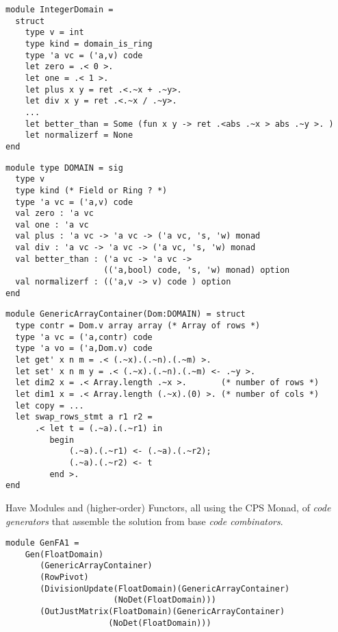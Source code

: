 \documentclass[landscape]{slides}
\begin{document}
\begin{slide}
\begin{verbatim}
module IntegerDomain = 
  struct
    type v = int
    type kind = domain_is_ring
    type 'a vc = ('a,v) code
    let zero = .< 0 >.  
    let one = .< 1 >. 
    let plus x y = ret .<.~x + .~y>. 
    let div x y = ret .<.~x / .~y>.
    ...
    let better_than = Some (fun x y -> ret .<abs .~x > abs .~y >. )
    let normalizerf = None 
end
\end{verbatim}
\end{slide}

\begin{slide}
\begin{verbatim}
module type DOMAIN = sig
  type v
  type kind (* Field or Ring ? *)
  type 'a vc = ('a,v) code
  val zero : 'a vc
  val one : 'a vc
  val plus : 'a vc -> 'a vc -> ('a vc, 's, 'w) monad
  val div : 'a vc -> 'a vc -> ('a vc, 's, 'w) monad
  val better_than : ('a vc -> 'a vc -> 
                    (('a,bool) code, 's, 'w) monad) option
  val normalizerf : (('a,v -> v) code ) option
end 
\end{verbatim}
\end{slide}

\begin{slide}
\begin{verbatim}
module GenericArrayContainer(Dom:DOMAIN) = struct
  type contr = Dom.v array array (* Array of rows *)
  type 'a vc = ('a,contr) code
  type 'a vo = ('a,Dom.v) code
  let get' x n m = .< (.~x).(.~n).(.~m) >.
  let set' x n m y = .< (.~x).(.~n).(.~m) <- .~y >.
  let dim2 x = .< Array.length .~x >.       (* number of rows *)
  let dim1 x = .< Array.length (.~x).(0) >. (* number of cols *)
  let copy = ...
  let swap_rows_stmt a r1 r2 =
      .< let t = (.~a).(.~r1) in
         begin 
             (.~a).(.~r1) <- (.~a).(.~r2);
             (.~a).(.~r2) <- t
         end >.
end
\end{verbatim}
\end{slide}

\begin{slide}
    Have Modules and (higher-order) Functors, all using the CPS Monad, of
    \emph{code generators} that assemble the solution from base \emph{code
    combinators}.
\begin{verbatim}
module GenFA1 = 
    Gen(FloatDomain)
       (GenericArrayContainer)
       (RowPivot)
       (DivisionUpdate(FloatDomain)(GenericArrayContainer)
                      (NoDet(FloatDomain)))
       (OutJustMatrix(FloatDomain)(GenericArrayContainer)
                     (NoDet(FloatDomain)))
\end{verbatim}
\end{slide}
\end{document}
